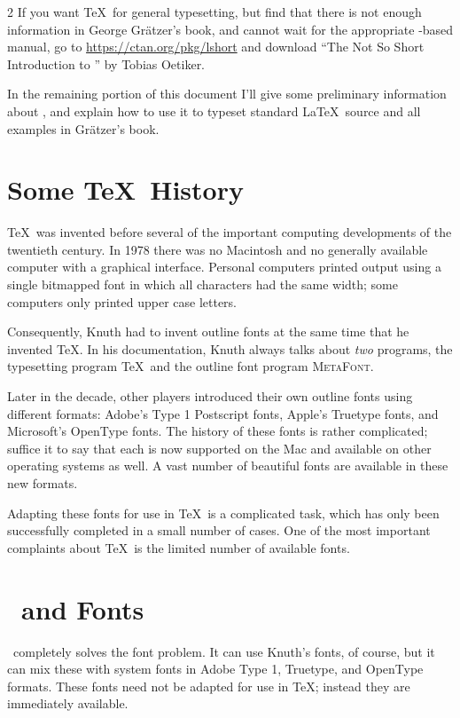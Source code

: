 \documentclass[11pt, oneside]{amsart}
\begin{document}
\begin{multicols}{2}
If you want \TeX\ for general typesetting, but find that there is not enough information in George Gr\"atzer's book, and cannot wait for the appropriate \XeLaTeX-based manual, go to \url{https://ctan.org/pkg/lshort} and download  ``The Not So Short Introduction to \LaTeXe'' by Tobias Oetiker. 

In the remaining portion of this document I'll give some preliminary information about \XeLaTeX, and explain how to use it to typeset standard \LaTeX\ source and all examples in Gr\"atzer's book.

\section{Some \TeX\ History}

\TeX\ was invented before several of the important computing developments of the twentieth century. In 1978 there was no Macintosh and no generally available computer with a graphical interface. Personal computers printed output using a single bitmapped font in which all characters had the same width; some computers only printed upper case letters.

Consequently, Knuth had to invent outline fonts at the same time that he invented \TeX. In his documentation, Knuth always talks about \emph{two} programs, the typesetting program \TeX\ and the outline font program \textsc{MetaFont}.

Later in the decade, other players introduced their own outline fonts using different formats: Adobe's Type 1 Postscript fonts, Apple's Truetype fonts, and Microsoft's OpenType fonts. The history of these fonts is rather complicated; suffice it to say that each is now supported on the Mac and available on other operating systems as well. A vast number of beautiful fonts are available in these new formats.

Adapting these fonts for use in \TeX\ is a complicated task, which has only been successfully completed in a small number of cases. One of the most important complaints about \TeX\ is the limited number of available fonts. 

\section{\XeLaTeX\ and Fonts}

\XeLaTeX\ completely solves the font problem. It can use Knuth's fonts, of course, but it can mix these with system fonts in Adobe Type 1, Truetype, and OpenType formats. These fonts need not be adapted for use in \TeX; instead they are immediately available.


\end{multicols}
\end{document}
